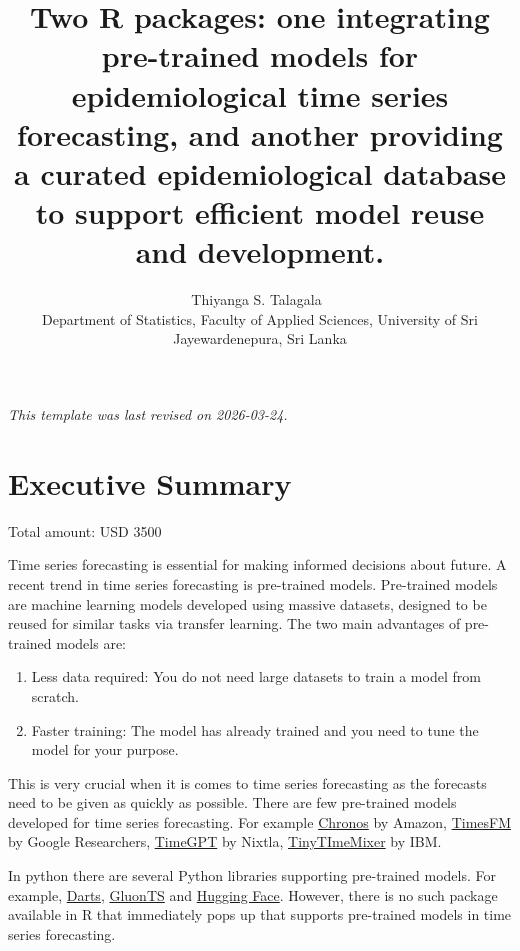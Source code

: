 \documentclass[
]{article}
\title{Two R packages: one integrating pre-trained models for
epidemiological time series forecasting, and another providing a curated
epidemiological database to support efficient model reuse and
development.}
\author{
{\large Thiyanga S. Talagala~\orcidlink{0000-0002-0656-9789}}%
 \\%
Department of Statistics, Faculty of Applied Sciences, University of Sri
Jayewardenepura, Sri Lanka \\%
{\footnotesize \url{}} \and
}
\date{}
\newcommand{\published}[1]{%
   \gdef\puB{#1}}
\newcommand{\puB}{}
\begin{document}
\published{\textbf{2026-04-30}}

\maketitle






\emph{This template was last revised on 2026-03-24.}

\section{Executive Summary}\label{executive-summary}

Total amount: USD 3500

Time series forecasting is essential for making informed decisions about
future. A recent trend in time series forecasting is pre-trained models.
Pre-trained models are machine learning models developed using massive
datasets, designed to be reused for similar tasks via transfer learning.
The two main advantages of pre-trained models are:

\begin{enumerate}
\def\labelenumi{\arabic{enumi}.}
\item
  Less data required: You do not need large datasets to train a model
  from scratch.
\item
  Faster training: The model has already trained and you need to tune
  the model for your purpose.
\end{enumerate}

This is very crucial when it is comes to time series forecasting as the
forecasts need to be given as quickly as possible. There are few
pre-trained models developed for time series forecasting. For example
\href{https://github.com/amazon-science/chronos-forecasting}{Chronos} by
Amazon, \href{https://github.com/google-research/timesfm}{TimesFM} by
Google Researchers, \href{https://github.com/Nixtla/nixtla}{TimeGPT} by
Nixtla,
\href{https://developer.ibm.com/tutorials/awb-foundation-model-time-series-forecasting/}{TinyTImeMixer}
by IBM.

In python there are several Python libraries supporting pre-trained
models. For example, \href{https://unit8co.github.io/darts/}{Darts},
\href{https://ts.gluon.ai/stable/}{GluonTS} and
\href{https://huggingface.co/models?other=time-series}{Hugging Face}.
However, there is no such package available in R that immediately pops
up that supports pre-trained models in time series forecasting.
\end{document}
